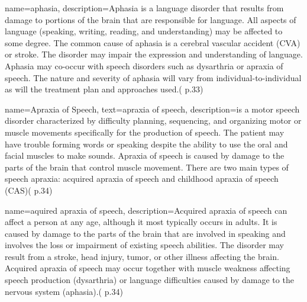 





 {
	name={aphasia}, 
	description={Aphasia is a language disorder that results from damage to portions of the brain that are responsible for language. All aspects of language (speaking, writing, reading, and understanding) may be affected to some degree. The common cause of aphasia is a cerebral vascular accident (CVA) or stroke. The disorder may impair the expression and understanding of language. Aphasia may co-occur with speech disorders such as dysarthria or apraxia of speech. The nature and severity of aphasia will vary from individual-to-individual as will the treatment plan and approaches used.(\cite{SLPathologies} p.33)
}
}


 {
	name={Apraxia of Speech}, 
	text={apraxia of speech},
	description={is a motor speech disorder characterized by difficulty planning, sequencing, and organizing motor or muscle movements specifically for the production of speech. The patient may have trouble forming words or speaking despite the ability to use the oral and facial muscles to make sounds. Apraxia of speech is caused by damage to the parts of the brain
that control muscle movement. There are two main types of speech apraxia: acquired apraxia of speech and childhood apraxia of speech (CAS)(\cite{SLPathologies} p.34)
}
}

 {
	name={aquired apraxia of speech}, 
	description={Acquired apraxia of speech can affect a person at any age, although it most typically occurs in adults. It is caused by damage to the parts of the brain that are involved in speaking and involves the loss or impairment of existing speech abilities. The disorder may result from a stroke, head injury, tumor, or other illness affecting the brain. Acquired apraxia of speech may
occur together with muscle weakness affecting speech production (dysarthria) or language difficulties caused by damage to the nervous system (aphasia).(\cite{SLPathologies} p.34)
}
}

